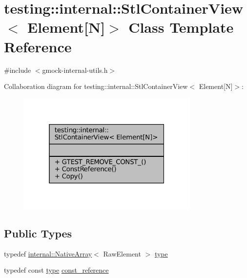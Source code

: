 \hypertarget{classtesting_1_1internal_1_1StlContainerView_3_01Element[N]_4}{}\section{testing\+:\+:internal\+:\+:Stl\+Container\+View$<$ Element\mbox{[}N\mbox{]}$>$ Class Template Reference}
\label{classtesting_1_1internal_1_1StlContainerView_3_01Element[N]_4}


{\ttfamily \#include $<$gmock-\/internal-\/utils.\+h$>$}



Collaboration diagram for testing\+:\+:internal\+:\+:Stl\+Container\+View$<$ Element\mbox{[}N\mbox{]}$>$\+:
\nopagebreak
\begin{figure}[H]
\begin{center}
\leavevmode
\includegraphics[width=256pt]{classtesting_1_1internal_1_1StlContainerView_3_01Element[N]_4__coll__graph}
\end{center}
\end{figure}
\subsection*{Public Types}
\begin{DoxyCompactItemize}
\item 
typedef \hyperlink{classtesting_1_1internal_1_1NativeArray}{internal\+::\+Native\+Array}$<$ Raw\+Element $>$ \hyperlink{classtesting_1_1internal_1_1StlContainerView_3_01Element[N]_4_a364efca99cc5a02829b4e3413c506b09}{type}
\item 
typedef const \hyperlink{classtesting_1_1internal_1_1StlContainerView_3_01Element[N]_4_a364efca99cc5a02829b4e3413c506b09}{type} \hyperlink{classtesting_1_1internal_1_1StlContainerView_3_01Element[N]_4_a481e6ab99316939484fad9c561af5e28}{const\+\_\+reference}
\end{DoxyCompactItemize}
